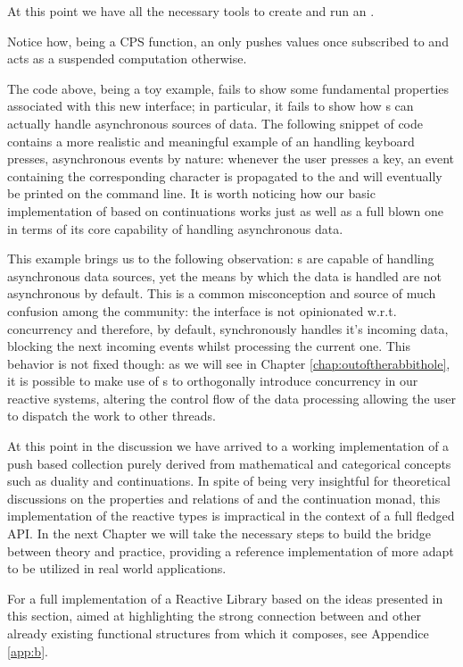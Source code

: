 At this point we have all the necessary tools to create and run an .


Notice how, being a CPS function, an  only pushes values once subscribed to and acts as a suspended computation otherwise. 

The code above, being a toy example, fails to show some fundamental properties associated with this new interface; in particular, it fails to show how s can actually handle asynchronous sources of data. The following snippet of code contains a more realistic and meaningful example of an  handling keyboard presses, asynchronous events by nature: whenever the user presses a key, an event containing the corresponding character is propagated to the  and will eventually be printed on the command line. It is worth noticing how our basic implementation of  based on continuations works just as well as a full blown one in terms of its core capability of handling asynchronous data.


This example brings us to the following observation: s are capable of handling asynchronous data sources, yet the means by which the data is handled are not asynchronous by default. This is a common misconception and source of much confusion among the community: the  interface is not opinionated w.r.t. concurrency and therefore, by default, synchronously handles it's incoming data, blocking the next incoming events whilst processing the current one. This behavior is not fixed though: as we will see in Chapter \ref{chap:outoftherabbithole}, it is possible to make use of s to orthogonally introduce concurrency in our reactive systems, altering the control flow of the data processing allowing the user to dispatch the work to other threads.

At this point in the discussion we have arrived to a working implementation of a push based collection purely derived from mathematical and categorical concepts such as duality and continuations. In spite of being very insightful for theoretical discussions on the properties and relations of  and the continuation monad, this implementation of the reactive types is impractical in the context of a full fledged API. In the next Chapter we will take the necessary steps to build the bridge between theory and practice, providing a reference implementation of  more adapt to be utilized in real world applications.

For a full implementation of a Reactive Library based on the ideas presented in this section, aimed at highlighting the strong connection between  and other already existing functional structures from which it composes, see Appendice \ref{app:b}. 